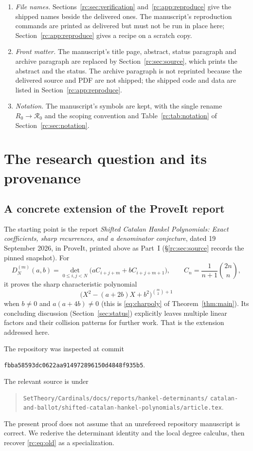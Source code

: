 \documentclass[11pt,a4paper]{article}
\numberwithin{equation}{section}
\theoremstyle{definition}
\theoremstyle{remark}
\newcommand{\Rzero}{\mathcal R_0}
\begin{document}
\begin{enumerate}[leftmargin=*,itemsep=2pt]
 report is replaced by Part~I itself and the pin recorded in
 Section~\ref{rc:sec:source}.
\item \emph{File names.}  Sections~\ref{rc:sec:verification}
 and~\ref{rc:app:reproduce} give the shipped names beside the delivered
 ones.  The manuscript's reproduction commands are printed as delivered
 but must not be run in place here; Section~\ref{rc:app:reproduce} gives
 a recipe on a scratch copy.
\item \emph{Front matter.}  The manuscript's title page, abstract, status
 paragraph and archive paragraph are replaced by
 Section~\ref{rc:sec:source}, which prints the abstract and the status.
 The archive paragraph is not reprinted because the delivered source and
 PDF are not shipped; the shipped code and data are listed in
 Section~\ref{rc:app:reproduce}.
\item \emph{Notation.}  The manuscript's symbols are kept, with the single
 rename $R_0\to\Rzero$ and the scoping convention and
 Table~\ref{rc:tab:notation} of Section~\ref{rc:sec:notation}.
\end{enumerate}

\section{The research question and its provenance}\label{rc:sec:scope}

\subsection{A concrete extension of the ProveIt report}
The starting point is the report \emph{Shifted Catalan Hankel Polynomials:
Exact coefficients, sharp recurrences, and a denominator conjecture},
dated 19 September 2026, in ProveIt, printed above as Part~I
(\S\ref{rc:sec:source} records the pinned snapshot).  For
\[
 D_N^{(m)}(a,b)=\det_{0\le i,j<N}
                  \bigl(aC_{i+j+m}+bC_{i+j+m+1}\bigr),
 \qquad C_n=\frac1{n+1}\binom{2n}{n},
\]
it proves the sharp characteristic polynomial
\begin{equation}\label{rc:eq:old}
 \bigl(X^2-(a+2b)X+b^2\bigr)^{\binom m2+1}
\end{equation}
when $b\ne0$ and $a(a+4b)\ne0$ (this is \eqref{eq:charpoly} of
Theorem~\ref{thm:main}).  Its concluding discussion
(Section~\ref{sec:status}) explicitly leaves multiple linear factors and
their collision patterns for further work.  That is the extension
addressed here.

The repository was inspected at commit
\begin{center}\small\texttt{fbba58593dc0622aa914972896150d4848f935b5}.\end{center}
The relevant source is under
\begin{quote}\small\raggedright
\nolinkurl{SetTheory/Cardinals/docs/reports/hankel-determinants/}\allowbreak
\nolinkurl{catalan-and-ballot/shifted-catalan-hankel-polynomials/article.tex}.
\end{quote}
The present proof does not assume that an unrefereed repository manuscript
is correct.  We rederive the determinant identity and the local degree
calculus, then recover \eqref{rc:eq:old} as a specialization.
\end{document}
